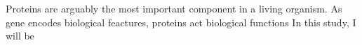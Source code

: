 Proteins are arguably the most important component in a living organism. As gene encodes biological feactures, proteins act biological functions   In this study, I will be 